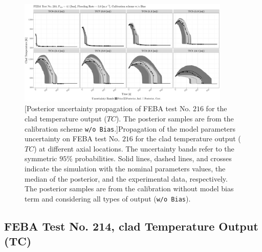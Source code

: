 \clearpage
\begin{figure}
	\centering
	\includegraphics[width=0.90\textwidth]{../figures/chapter5/figures/plotTraceUQPosteriorAllNoDiscNoBCTC216}
		[Posterior uncertainty propagation of FEBA test No. $216$ for the clad temperature output ($TC$). The posterior samples are from the calibration scheme \texttt{w/o Bias}.]{Propagation of the model parameters uncertainty on FEBA test No. $216$ for the clad temperature output ($TC$) at different axial locations. The uncertainty bands refer to the symmetric $95\%$ probabilities. Solid lines, dashed lines, and crosses indicate the simulation with the nominal parameters values, the median of the posterior, and the experimental data, respectively. The posterior samples are from the calibration without model bias term and considering all types of output (\texttt{w/o Bias}).}
	\label{fig:ch5_plot_trace_uq_post_tc_216_nodisc}
\end{figure}
\clearpage

\subsection{FEBA Test No. 214, clad Temperature Output (TC)}\label{app:tbl_results_uq_post_tc_214}

